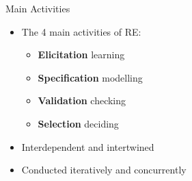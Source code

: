 
\begin{Slide}{Main Activities}

\begin{itemize}
\item The 4 main activities of RE: 
\begin{itemize}
\item \textbf{Elicitation} \hfill learning
\item \textbf{Specification} \hfill modelling
\item \textbf{Validation}  \hfill checking
\item \textbf{Selection}   \hfill deciding
\end{itemize}
\item Interdependent and intertwined
\item Conducted iteratively and concurrently

\end{itemize}
\end{Slide}